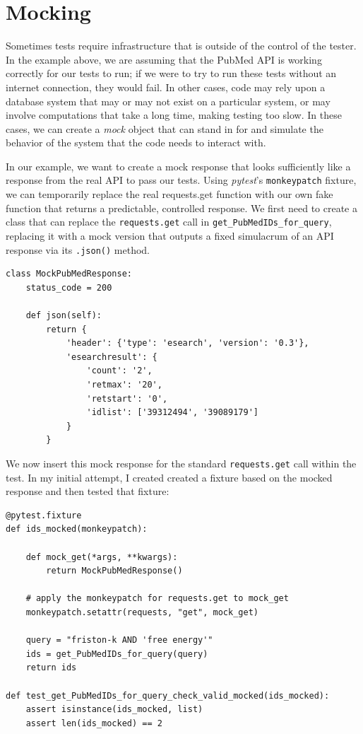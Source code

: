 \section{Mocking}

Sometimes tests require infrastructure that is outside of the control of the tester.
In the example above, we are assuming that the PubMed API is working correctly for our tests to run; if we were to try to run these tests without an internet connection, they would fail.
In other cases, code may rely upon a database system that may or may not exist on a particular system, or may involve computations that take a long time, making testing too slow.
In these cases, we can create a \textit{mock} object that can stand in for and simulate the behavior of the system that the code needs to interact with.

In our example, we want to create a mock response that looks sufficiently like a response from the real API to pass our tests.
Using \textit{pytest}'s \texttt{monkeypatch} fixture, we can temporarily replace the real requests.get function with our own fake function that returns a predictable, controlled response.
We first need to create a class that can replace the \texttt{requests.get} call in \texttt{get\_PubMedIDs\_for\_query}, replacing it with a mock version that outputs a fixed simulacrum of an API response via its \texttt{.json()} method.

\begin{lstlisting}[style=Python]
class MockPubMedResponse:
    status_code = 200

    def json(self):
        return {
            'header': {'type': 'esearch', 'version': '0.3'},
            'esearchresult': {
                'count': '2',
                'retmax': '20',
                'retstart': '0',
                'idlist': ['39312494', '39089179']
            }
        }
\end{lstlisting}

We now insert this mock response for the standard \texttt{requests.get} call within the test.
In my initial attempt, I created created a fixture based on the mocked response and then tested that fixture:

\begin{lstlisting}[style=Python]
@pytest.fixture
def ids_mocked(monkeypatch):

    def mock_get(*args, **kwargs):
        return MockPubMedResponse()

    # apply the monkeypatch for requests.get to mock_get
    monkeypatch.setattr(requests, "get", mock_get)

    query = "friston-k AND 'free energy'"
    ids = get_PubMedIDs_for_query(query)
    return ids

def test_get_PubMedIDs_for_query_check_valid_mocked(ids_mocked):
    assert isinstance(ids_mocked, list)
    assert len(ids_mocked) == 2
\end{lstlisting}

